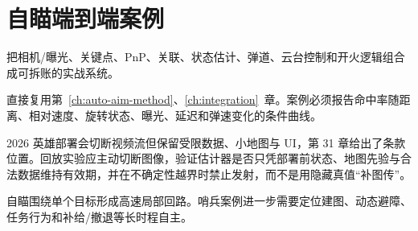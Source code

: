\chapter{自瞄端到端案例}
\label{ch:auto-aim-case}

\begin{learningobjectives}
把相机/曝光、关键点、PnP、关联、状态估计、弹道、云台控制和开火逻辑组合成可拆账的实战系统。
\end{learningobjectives}

\begin{prerequisites}
直接复用第~\ref{ch:auto-aim-method}、\ref{ch:integration}~章。案例必须报告命中率随距离、相对速度、旋转状态、曝光、延迟和弹速变化的条件曲线。
\end{prerequisites}


\begin{engineeringcheck}
2026 英雄部署会切断视频流但保留受限数据、小地图与 UI，第 31 章给出了条款位置。回放实验应主动切断图像，验证估计器是否只凭部署前状态、地图先验与合法数据维持有效期，并在不确定性越界时禁止发射，而不是用隐藏真值“补图传”。
\end{engineeringcheck}

\begin{chaptertransition}
自瞄围绕单个目标形成高速局部回路。哨兵案例进一步需要定位建图、动态避障、任务行为和补给/撤退等长时程自主。
\end{chaptertransition}
